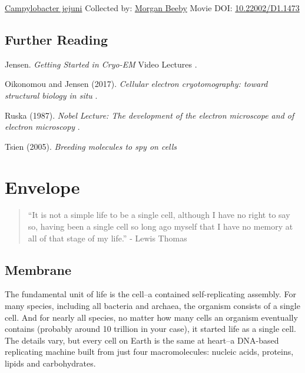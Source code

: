 \documentclass[]{tufte-book}
\begin{document}
\hypertarget{htmlwidget-d849d5a25e1610a06a65}{}

\label{fig:1-10a}\protect\hyperlink{tree}{Campylobacter jejuni} Collected by: \protect\hyperlink{morgan_beeby}{Morgan Beeby} Movie DOI: \href{https://doi.org/10.22002/D1.1473}{10.22002/D1.1473}

\hypertarget{further-reading}{%
\section{Further Reading}\label{further-reading}}

Jensen. \emph{Getting Started in Cryo-EM} Video Lectures \citep{jensenInternet}.

Oikonomou and Jensen (2017). \emph{Cellular electron cryotomography: toward structural biology in situ} \citep{oikonomou2017}.

Ruska (1987). \emph{Nobel Lecture: The development of the electron microscope and of electron microscopy} \citep{ruska1987}.

Tsien (2005). \emph{Breeding molecules to spy on cells} \citep{tsien2005}

\hypertarget{envelope}{%
\chapter{Envelope}\label{envelope}}

\begin{quote}
``It is not a simple life to be a single cell, although I have no right to say so, having been a single cell so long ago myself that I have no memory at all of that stage of my life.''
- Lewis Thomas \citep{thomas1990}
\end{quote}

\hypertarget{membrane}{%
\section{Membrane}\label{membrane}}

The fundamental unit of life is the cell--a contained self-replicating assembly. For many species, including all bacteria and archaea, the organism consists of a single cell. And for nearly all species, no matter how many cells an organism eventually contains (probably around 10 trillion in your case), it started life as a single cell. The details vary, but every cell on Earth is the same at heart--a DNA-based replicating machine built from just four macromolecules: nucleic acids, proteins, lipids and carbohydrates.
\end{document}
